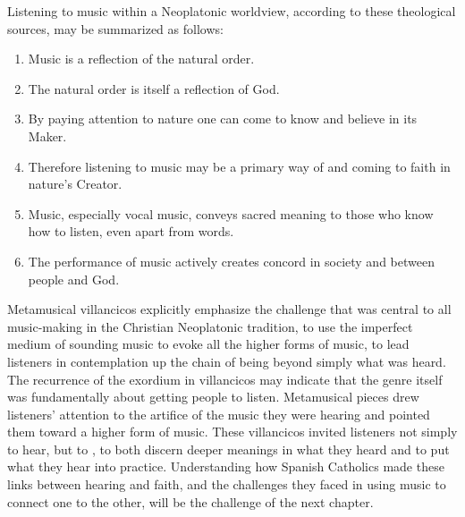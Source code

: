
Listening to music within a Neoplatonic worldview, according to these
theological sources, may be summarized as follows:
\begin{enumerate}
\item Music is a reflection of the natural order.
\item The natural order is itself a reflection of God.
\item By paying attention to nature one can come to know and believe in its
    Maker.
\item Therefore listening to music may be a primary way of  and coming to faith in nature's Creator.
\item Music, especially vocal music, conveys sacred meaning to those who know
    how to listen, even apart from words.
\item The performance of music actively creates concord in society and between
    people and God.  
\end{enumerate}

Metamusical villancicos explicitly emphasize the challenge that was central to
all music-making in the Christian Neoplatonic tradition, to use the imperfect
medium of sounding music to evoke all the higher forms of music, to lead
listeners in contemplation up the chain of being beyond simply what was heard.
The recurrence of the  exordium in villancicos may indicate
that the genre itself was fundamentally about getting people to listen.
Metamusical pieces drew listeners' attention to the artifice of the music they
were hearing and pointed them toward a higher form of music.
These villancicos invited listeners not simply to hear, but to , to both discern deeper meanings in what they heard and to
put what they hear into practice.
Understanding how Spanish Catholics made these links between hearing and faith,
and the challenges they faced in using music to connect one to the other, will
be the challenge of the next chapter.

\endinput
